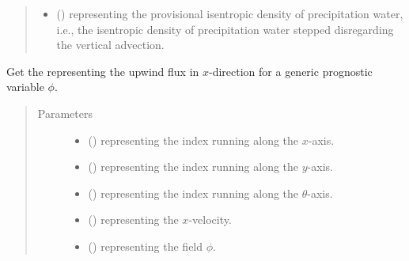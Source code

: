 \documentclass[letterpaper,10pt,english]{sphinxmanual}
\begin{document}
\begin{fulllineitems}
\begin{fulllineitems}
\begin{quote}
\begin{description}
\begin{itemize}
\item {} 
 () \textendash{}  representing the provisional isentropic density of precipitation water,
i.e., the isentropic density of precipitation water stepped disregarding the vertical advection.

\end{itemize}

\end{description}\end{quote}

\end{fulllineitems}


\begin{fulllineitems}
\label{\detokenize{api:dycore.flux_isentropic_upwind.FluxIsentropicUpwind._get_upwind_flux_x}}
Get the  representing the upwind flux in \(x\)-direction for a generic
prognostic variable \(\phi\).
\begin{quote}\begin{description}
\item[{Parameters}] \leavevmode\begin{itemize}
\item {} 
 () \textendash{}  representing the index running along the \(x\)-axis.

\item {} 
 () \textendash{}  representing the index running along the \(y\)-axis.

\item {} 
 () \textendash{}  representing the index running along the \(\theta\)-axis.

\item {} 
 () \textendash{}  representing the \(x\)-velocity.

\item {} 
 () \textendash{}  representing the field \(\phi\).


\end{itemize}
\end{description}
\end{quote}
\end{fulllineitems}
\end{fulllineitems}
\end{document}
